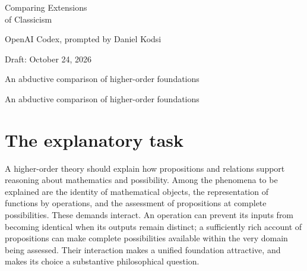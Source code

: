 \documentclass[12pt,letterpaper]{article}
\newcommand{\papertitle}{Paper Title}
\newcommand{\paperauthor}{Author Name}
\newcommand{\paperdate}{Draft: \today}
\newcommand{\papernote}{}
\newcommand{\makestyledtitle}{%
  \begin{center}
    \vspace*{0.5in}
    {\huge\linespread{1.05}\selectfont \papertitle\par}
    \vspace{0.35in}
    {\large \paperauthor\par}
    \vspace{0.2in}
    {\large \paperdate\par}
    \ifx\papernote\empty\else
      {\large \papernote\par}
    \fi
  \end{center}
  \vspace{0.4in}
}
\begin{document}
\renewcommand{\papertitle}{Comparing Extensions\\of Classicism}
\renewcommand{\paperauthor}{OpenAI Codex, prompted by Daniel Kodsi}
\renewcommand{\paperdate}{Draft: October 24, 2026}
\renewcommand{\papernote}{An abductive comparison of higher-order foundations}
\makestyledtitle
\begin{abstract}
The standard possible-worlds picture combines C5 and Atomicity with full higher-order domains. This paper compares its explanatory merits with those of Maximalist Classicism and Strong Possibility. Maximalism preserves broad logical possibilities at the cost of restrictions on operation representation and complete internal assessment. Strong Possibility adds much sharper consequences, including actual individual monism in the pure language and exhaustion by finitely many individual names in the corresponding signatures. The positive case develops necessary Plenitude as a route to the standard structure over Classicism, and endpoint-valued logical observer separation as a simpler route over H. These are equivalent structural foundations. Relational Choice, equivalent over them to Functional Choice, is assessed as a further selection principle. Infinitary Comprehension receives a distinct, secondary role: it characterizes fullness and recovers the full power of the standard hierarchy, even when abstraction must itself be reconstructed. The comparison concerns explanatory adequacy, not deductive strength alone.
\end{abstract}
\clearpage
\tableofcontents
\clearpage

\section{The explanatory task}\label{sec:task}

A higher-order theory should explain how propositions and relations support reasoning about mathematics and possibility. Among the phenomena to be explained are the identity of mathematical objects, the representation of functions by operations, and the assessment of propositions at complete possibilities. These demands interact. An operation can prevent its inputs from becoming identical when its outputs remain distinct; a sufficiently rich account of propositions can make complete possibilities available within the very domain being assessed. Their interaction makes a unified foundation attractive, and makes its choice a substantive philosophical question.
\end{document}
